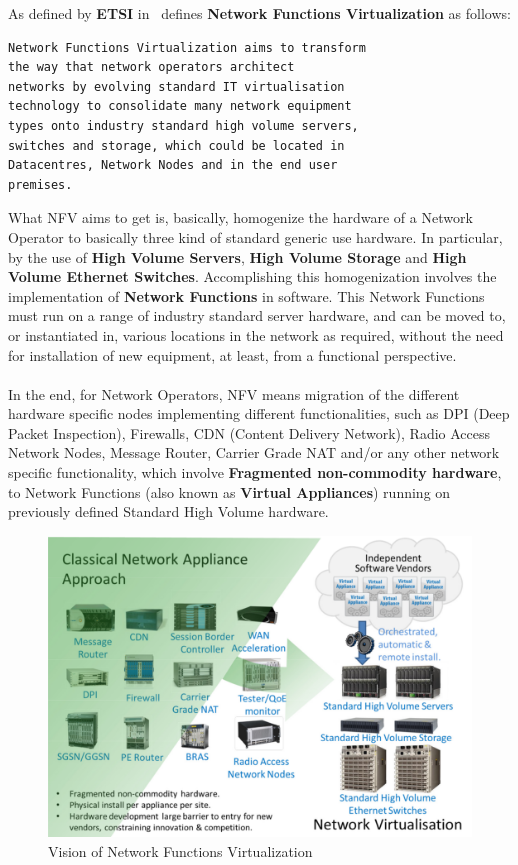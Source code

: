 \documentclass[a4paper, 12pt]{book}
\begin{document}
As defined by \textbf{ETSI} in~\cite{ETSINFVDefinition} defines \textbf{Network Functions Virtualization} as follows:
\begin{verbatim}
Network Functions Virtualization aims to transform
the way that network operators architect
networks by evolving standard IT virtualisation
technology to consolidate many network equipment
types onto industry standard high volume servers,
switches and storage, which could be located in
Datacentres, Network Nodes and in the end user
premises.
\end{verbatim}
What NFV aims to get is, basically, homogenize the hardware of a Network Operator to basically three kind of standard generic use hardware. In particular, by the use of \textbf{High Volume Servers}, \textbf{High Volume Storage} and \textbf{High Volume Ethernet Switches}. Accomplishing this homogenization involves the implementation of \textbf{Network Functions} in software. This Network Functions must run on a range of industry standard server hardware, and can be moved to, or instantiated in, various locations in the network as required, without the need for installation of new equipment, at least, from a functional perspective.\\
\\
In the end, for Network Operators, NFV means migration of the different hardware specific nodes implementing different functionalities, such as DPI (Deep Packet Inspection), Firewalls, CDN (Content Delivery Network), Radio Access Network Nodes, Message Router, Carrier Grade NAT and/or any other network specific functionality, which involve \textbf{Fragmented non-commodity hardware}, to Network Functions (also known as \textbf{Virtual Appliances}) running on previously defined Standard High Volume hardware.

\begin{center}
 \begin{figure}[H]
 \begin{center}
   \includegraphics[width=15cm]{img/nfv-etsi-01.png}
   \caption{Vision of Network Functions Virtualization}
   \label{fig:nfv_vision}
 \end{center}
 \end{figure}
\end{center}
\end{document}
